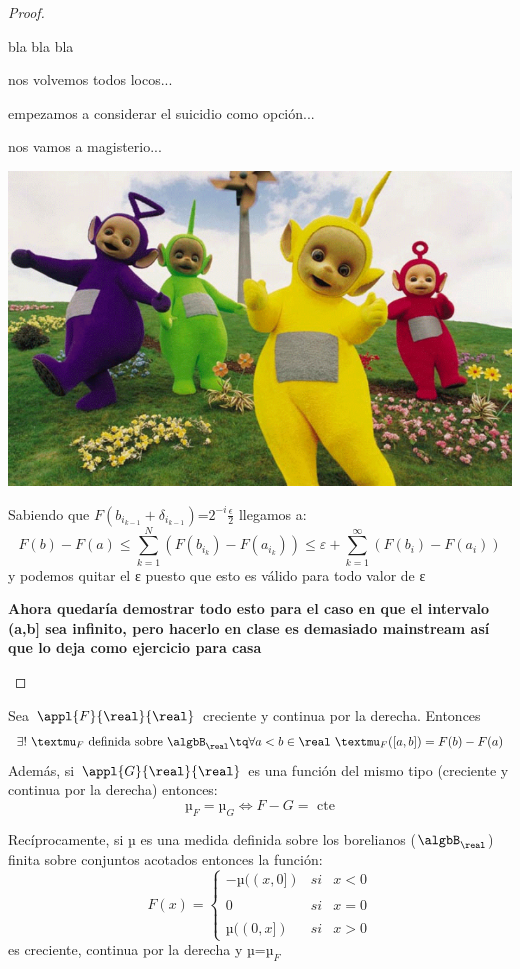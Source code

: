 \documentclass{apuntes}
\begin{document}
\begin{proof}
\begin{enumerate}
bla bla bla

nos volvemos todos locos...

empezamos a considerar el suicidio como opción...

nos vamos a magisterio...

\begin{center}
\includegraphics[scale=0.5]{img/teletubie.png}
\end{center}

Sabiendo que $F(b_{i_{k-1}}+\delta_{i_{k-1}})$=$2^{-i}\frac{\epsilon}{2}$ llegamos a:
\[F(b)-F(a) \leq \sum_{k=1}^N(F(b_{i_k})-F(a_{i_k})) \leq ε + \sum_{k=1}^{\infty}(F(b_i)-F(a_i))\]
y podemos quitar el ε puesto que esto es válido para todo valor de ε

\textbf{Ahora quedaría demostrar todo esto para el caso en que el intervalo (a,b] sea infinito, pero hacerlo en clase es demasiado mainstream así que lo deja como ejercicio para casa}
\end{enumerate}
\end{proof}

\begin{theorem}
Sea $\appl{F}{\real}{\real}$ creciente y continua por la derecha. Entonces
\[\exists ! \ µ_F \text{ definida sobre } \algbB_{\real} \tq \forall a<b \in \real \ µ_F([a,b])=F(b)-F(a)\]
Además, si $\appl{G}{\real}{\real}$ es una función del mismo tipo (creciente y continua por la derecha) entonces:
\[µ_F = µ_G \iff F-G = \text{ cte}\]

Recíprocamente, si µ es una medida definida sobre los borelianos ($\algbB_{\real}$) finita sobre conjuntos acotados entonces la función:
\[F(x)= \left\{ \begin{array}{lcc}
             -µ((x,0]) &   si  & x < 0 \\
             \\ 0 &  si & x=0 \\
             \\ µ((0, x]) &  si  & x > 0
             \end{array}
   \right.\]
es creciente, continua por la derecha y µ=$µ_F$
\end{theorem}
\end{document}
